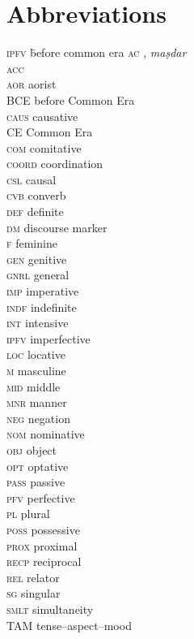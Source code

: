 \documentclass[output=paper]{langsci/langscibook}
\begin{document}
\section*{Abbreviations}
\begin{multicols}{2}
\begin{tabbing}
\textsc{ipfv} \hspace{1em} \= before common era\kill
\textsc{ac} \> , \textit{maṣdar} \\
\textsc{acc} \\
\textsc{aor} \> aorist \\
BCE \> before Common Era \\
\textsc{caus} \> {{causative} } \\
CE \> Common Era \\
\textsc{com} \> {{comitative} }\\
\textsc{coord} \> {{coordination} }\\
\textsc{csl} \> {{causal} }\\
\textsc{cvb} \> {{converb} }\\
\textsc{def} \> {{definite} }\\
\textsc{dm} \> {{discourse marker}} \\
\textsc{f} \> {{feminine} }\\
\textsc{gen} \> genitive \\
\textsc{gnrl} \> {{general} }\\
\textsc{imp} \> {{imperative} }\\
\textsc{indf} \> {{indefinite} }\\
\textsc{int} \> {{intensive} }\\
\textsc{ipfv} \> {{imperfective} }\\
\textsc{loc} \> {{locative} }\\
\textsc{m} \> {{masculine} }\\
\textsc{mid} \> {{middle}}\\
\textsc{mnr} \> {{manner} }\\
\textsc{neg} \> {{negation} }\\
\textsc{nom} \> {{nominative} }\\
\textsc{obj} \> {{object} }\\
\textsc{opt} \> {{optative} }\\
\textsc{pass} \> {{passive} }\\
\textsc{pfv} \> {{perfective} }\\
\textsc{pl} \> plural \\
\textsc{poss} \> {{possessive} }\\
\textsc{prox} \> {{proximal} }\\
\textsc{recp} \> {{reciprocal}}\\
\textsc{rel} \> {{relator} }\\
\textsc{sg} \> {{singular} } \\
\textsc{smlt} \> {{simultaneity}} \\
TAM \> {{tense--aspect--mood}}
\end{tabbing}
\end{multicols}




\sloppy
\printbibliography[heading=subbibliography,notkeyword=this]
\end{document}
